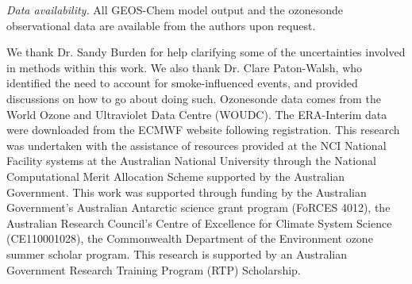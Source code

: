 \documentclass[acp, manuscript]{copernicus} %
\begin{document}

%
\textit{Data availability.} All GEOS-Chem model output and the ozonesonde observational data are available from the authors upon request.

\begin{acknowledgements}
We thank Dr. Sandy Burden for help clarifying some of the uncertainties involved in methods within this work.
We also thank Dr. Clare Paton-Walsh, who identified the need to account for smoke-influenced events, and provided discussions on how to go about doing such.
Ozonesonde data comes from the World Ozone and Ultraviolet Data Centre (WOUDC).
The ERA-Interim data were downloaded from the ECMWF website following registration.
This research was undertaken with the assistance of resources provided at the NCI National Facility systems at the Australian National University through the National Computational Merit Allocation Scheme supported by the Australian Government.
This work was supported through funding by the Australian Government's Australian Antarctic science grant program (FoRCES 4012), the Australian Research Council's Centre of Excellence for Climate System Science (CE110001028), the Commonwealth Department of the Environment ozone summer scholar program.
This research is supported by an Australian Government Research Training Program (RTP) Scholarship.
\end{acknowledgements}



\end{document}
